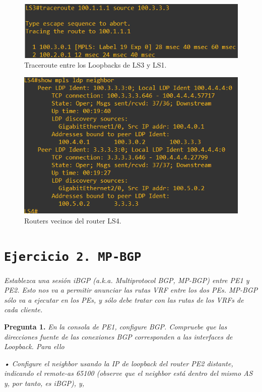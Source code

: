 \documentclass[a4paper, 12pt]{report}
\begin{document}
\begin{figure}[H]
	\centering
	\includegraphics[scale=0.8]{traceroutels3ls1.png}
	\caption{Traceroute entre los Loopbacks de LS3 y LS1.}
	\label{fig:traceroutels3ls1}
\end{figure}

\begin{figure}[H]
	\centering
	\includegraphics[scale=0.8]{neighborls4.png}
	\caption{Routers vecinos del router LS4.}
	\label{fig:neighborls4}
\end{figure}
\newpage

\section{\texttt{Ejercicio 2.  MP-BGP}}

\textit{Establezca una sesión iBGP (a.k.a. Multiprotocol BGP, MP-BGP) entre PE1 y PE2. Esto nos va a permitir anunciar las rutas VRF entre los dos PEs. MP-BGP sólo va a ejecutar en los PEs, y sólo debe tratar con las rutas de los VRFs de cada cliente.}

\textbf{Pregunta 1.}
\textit{En la consola de PE1, configure BGP. Compruebe que las direcciones fuente de las
conexiones BGP corresponden a las interfaces de Loopback. Para ello}

\textit{• Configure el neighbor usando la IP de loopback del router PE2 distante, indicando el
remote-as 65100 (observe que el neighbor está dentro del mismo AS y, por tanto, es iBGP),
y,}
\end{document}
